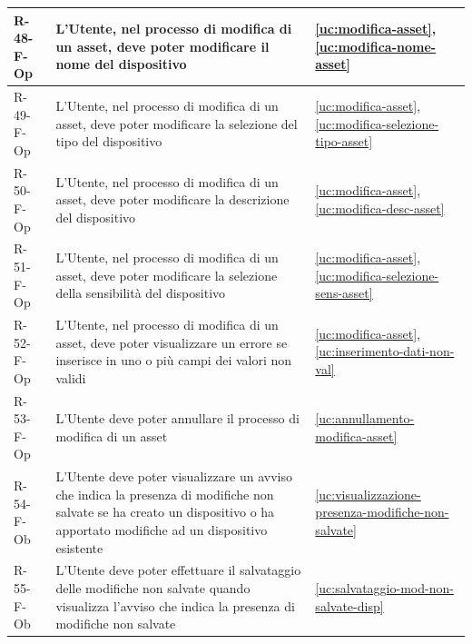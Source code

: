 ﻿\documentclass[a4paper,12pt]{article}
\begin{document}
{{\begin{longtable}{|l|p{}|p{}|}
            R-48-F-Op       & L'Utente, nel processo di modifica di un asset, deve poter modificare il nome del dispositivo                                                                                               & \ref{uc:modifica-asset}, \ref{uc:modifica-nome-asset}                 \\ \hline
            R-49-F-Op       & L'Utente, nel processo di modifica di un asset, deve poter modificare la selezione del tipo del dispositivo                                                                                 & \ref{uc:modifica-asset}, \ref{uc:modifica-selezione-tipo-asset}                 \\ \hline
            R-50-F-Op       & L'Utente, nel processo di modifica di un asset, deve poter modificare la descrizione del dispositivo                                                                                        & \ref{uc:modifica-asset}, \ref{uc:modifica-desc-asset}                 \\ \hline
            R-51-F-Op       & L'Utente, nel processo di modifica di un asset, deve poter modificare la selezione della sensibilità del dispositivo                                                                        & \ref{uc:modifica-asset}, \ref{uc:modifica-selezione-sens-asset}                 \\ \hline
            R-52-F-Op       & L'Utente, nel processo di modifica di un asset, deve poter visualizzare un errore se inserisce in uno o più campi dei valori non validi                                                     & \ref{uc:modifica-asset}, \ref{uc:inserimento-dati-non-val}                     \\ \hline
            R-53-F-Op       & L'Utente deve poter annullare il processo di modifica di un asset                                                                                                                           & \ref{uc:annullamento-modifica-asset}                                               \\ \hline
            R-54-F-Ob       & L'Utente deve poter visualizzare un avviso che indica la presenza di modifiche non salvate se ha creato un dispositivo o ha apportato modifiche ad un dispositivo esistente                 & \ref{uc:visualizzazione-presenza-modifiche-non-salvate}                                               \\ \hline
            R-55-F-Ob       & L'Utente deve poter effettuare il salvataggio delle modifiche non salvate quando visualizza l'avviso che indica la presenza di modifiche non salvate                                        & \ref{uc:salvataggio-mod-non-salvate-disp}                                               \\ \hline

\end{longtable}}}
\end{document}
